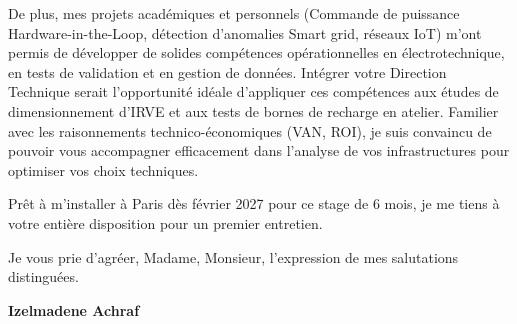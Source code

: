 \documentclass[10pt,a4paper]{../../altacv}
\begin{document}
\vspace{0.4cm}

De plus, mes projets académiques et personnels (Commande de puissance Hardware-in-the-Loop, détection d'anomalies Smart grid, réseaux IoT) m'ont permis de développer de solides compétences opérationnelles en électrotechnique, en tests de validation et en gestion de données. Intégrer votre Direction Technique serait l'opportunité idéale d'appliquer ces compétences aux études de dimensionnement d'IRVE et aux tests de bornes de recharge en atelier. Familier avec les raisonnements technico-économiques (VAN, ROI), je suis convaincu de pouvoir vous accompagner efficacement dans l'analyse de vos infrastructures pour optimiser vos choix techniques. 

\vspace{0.4cm}

Prêt à m'installer à Paris dès février 2027 pour ce stage de 6 mois, je me tiens à votre entière disposition pour un premier entretien. 

\vspace{0.5cm}

Je vous prie d'agréer, Madame, Monsieur, l'expression de mes salutations distinguées.

\vfill

\begin{flushright}
  \Large\color{emphasis}\textbf{Izelmadene Achraf}
\end{flushright}
\end{document}
